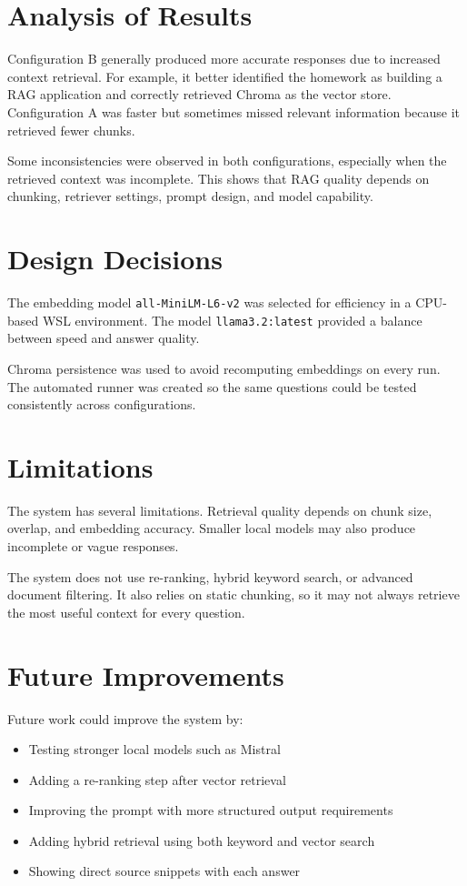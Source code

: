 \documentclass[11pt]{article}
\begin{document}
	\section{Analysis of Results}
	
	Configuration B generally produced more accurate responses due to increased context retrieval. For example, it better identified the homework as building a RAG application and correctly retrieved Chroma as the vector store. Configuration A was faster but sometimes missed relevant information because it retrieved fewer chunks.
	
	Some inconsistencies were observed in both configurations, especially when the retrieved context was incomplete. This shows that RAG quality depends on chunking, retriever settings, prompt design, and model capability.
	
	\section{Design Decisions}
	
	The embedding model \texttt{all-MiniLM-L6-v2} was selected for efficiency in a CPU-based WSL environment. The model \texttt{llama3.2:latest} provided a balance between speed and answer quality.
	
	Chroma persistence was used to avoid recomputing embeddings on every run. The automated runner was created so the same questions could be tested consistently across configurations.
	
	\section{Limitations}
	
	The system has several limitations. Retrieval quality depends on chunk size, overlap, and embedding accuracy. Smaller local models may also produce incomplete or vague responses.
	
	The system does not use re-ranking, hybrid keyword search, or advanced document filtering. It also relies on static chunking, so it may not always retrieve the most useful context for every question.
	
	\section{Future Improvements}
	
	Future work could improve the system by:
	
	\begin{itemize}
		\item Testing stronger local models such as Mistral
		\item Adding a re-ranking step after vector retrieval
		\item Improving the prompt with more structured output requirements
		\item Adding hybrid retrieval using both keyword and vector search
		\item Showing direct source snippets with each answer
	\end{itemize}
	
\end{document}
